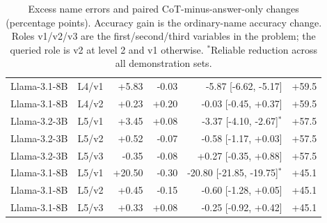 \begin{table}[t]
{\begin{tabular}{@{}llrrrr@{}}
Llama-3.1-8B & L4/v1 & +5.83 & -0.03 & -5.87 [-6.62, -5.17] & +59.5 \\
Llama-3.1-8B & L4/v2 & +0.23 & +0.20 & -0.03 [-0.45, +0.37] & +59.5 \\
Llama-3.2-3B & L5/v1 & +3.45 & +0.08 & -3.37 [-4.10, -2.67]$^{*}$ & +57.5 \\
Llama-3.2-3B & L5/v2 & +0.52 & -0.07 & -0.58 [-1.17, +0.03] & +57.5 \\
Llama-3.2-3B & L5/v3 & -0.35 & -0.08 & +0.27 [-0.35, +0.88] & +57.5 \\
Llama-3.1-8B & L5/v1 & +20.50 & -0.30 & -20.80 [-21.85, -19.75]$^{*}$ & +45.1 \\
Llama-3.1-8B & L5/v2 & +0.45 & -0.15 & -0.60 [-1.28, +0.05] & +45.1 \\
Llama-3.1-8B & L5/v3 & +0.33 & +0.08 & -0.25 [-0.92, +0.42] & +45.1 \\
\bottomrule
\end{tabular}}
\ifdim\wd\roundsevenbox>\textwidth\resizebox{\textwidth}{!}{\usebox{\roundsevenbox}}\else\usebox{\roundsevenbox}\fi
\caption{Excess name errors and paired CoT-minus-answer-only changes (percentage points). Accuracy gain is the ordinary-name accuracy change. Roles v1/v2/v3 are the first/second/third variables in the problem; the queried role is v2 at level 2 and v1 otherwise. $^{*}$Reliable reduction across all demonstration sets.}
\label{a-tab:round7-paired-2}
\end{table}
